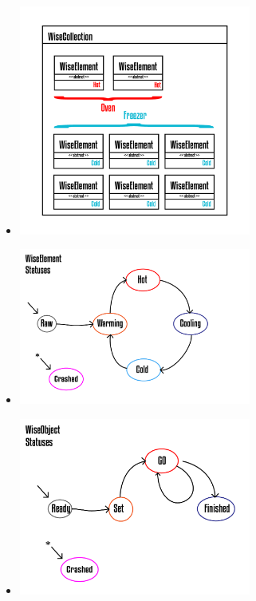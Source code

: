\documentclass[10pt]{beamer}
\theoremstyle{remark}
\theoremstyle{definition}
\begin{document}
\begin{frame}[allowframebreaks]
\begin{itemize}
		\end{itemize}
		
		\framebreak
		\begin{itemize}
			
			\item \includegraphics[width=0.6\textwidth]{images/Prancheta 17@4x.png}
			
		\end{itemize}
		
		\framebreak
		\begin{itemize}
			
			\item \includegraphics[width=0.6\textwidth]{images/Prancheta 7@4x.png}
			
		\end{itemize}
		
		\framebreak
		\begin{itemize}
			
			\item \includegraphics[width=0.6\textwidth]{images/Prancheta 16@4x.png}
			

\end{itemize}
\end{frame}
\end{document}
